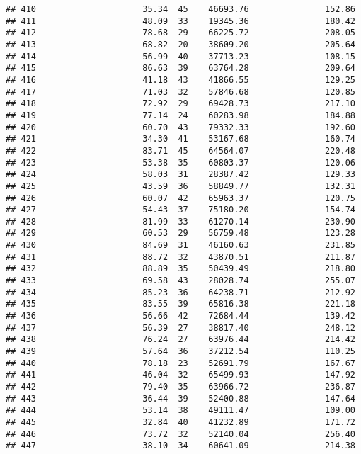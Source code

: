 \documentclass[
]{article}
\begin{document}
\begin{verbatim}
## 410                     35.34  45    46693.76               152.86
## 411                     48.09  33    19345.36               180.42
## 412                     78.68  29    66225.72               208.05
## 413                     68.82  20    38609.20               205.64
## 414                     56.99  40    37713.23               108.15
## 415                     86.63  39    63764.28               209.64
## 416                     41.18  43    41866.55               129.25
## 417                     71.03  32    57846.68               120.85
## 418                     72.92  29    69428.73               217.10
## 419                     77.14  24    60283.98               184.88
## 420                     60.70  43    79332.33               192.60
## 421                     34.30  41    53167.68               160.74
## 422                     83.71  45    64564.07               220.48
## 423                     53.38  35    60803.37               120.06
## 424                     58.03  31    28387.42               129.33
## 425                     43.59  36    58849.77               132.31
## 426                     60.07  42    65963.37               120.75
## 427                     54.43  37    75180.20               154.74
## 428                     81.99  33    61270.14               230.90
## 429                     60.53  29    56759.48               123.28
## 430                     84.69  31    46160.63               231.85
## 431                     88.72  32    43870.51               211.87
## 432                     88.89  35    50439.49               218.80
## 433                     69.58  43    28028.74               255.07
## 434                     85.23  36    64238.71               212.92
## 435                     83.55  39    65816.38               221.18
## 436                     56.66  42    72684.44               139.42
## 437                     56.39  27    38817.40               248.12
## 438                     76.24  27    63976.44               214.42
## 439                     57.64  36    37212.54               110.25
## 440                     78.18  23    52691.79               167.67
## 441                     46.04  32    65499.93               147.92
## 442                     79.40  35    63966.72               236.87
## 443                     36.44  39    52400.88               147.64
## 444                     53.14  38    49111.47               109.00
## 445                     32.84  40    41232.89               171.72
## 446                     73.72  32    52140.04               256.40
## 447                     38.10  34    60641.09               214.38

\end{verbatim}
\end{document}
